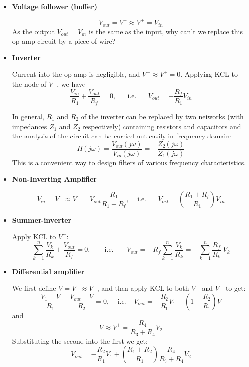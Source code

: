
\begin{itemize}
\item {\bf Voltage follower (buffer)}


\[
V_{out}=V^-\approx V^+=V_{in} 
\]
As the output $V_{out}=V_{in}$ is the same as the input, why can't we replace this
op-amp circuit by a piece of wire?

\item {\bf Inverter}


Current into the op-amp is negligible, and $V^-\approx V^+=0$. Applying KCL to
the node of $V^-$, we have
\[ 
\frac{V_{in}}{R_1}+\frac{V_{out}}{R_f}=0,\;\;\;\;\;\;\mbox{i.e.}\;\;\;\;\;\;
V_{out}=-\frac{R_f}{R_1}V_{in}	
\]

In general, $R_1$ and $R_2$ of the inverter can be replaced by two networks (with
impedances $Z_1$ and $Z_2$ respectively) containing resistors and capacitors and
the analysis of the circuit can be carried out easily in frequency domain:
\[
H(j\omega)=\frac{V_{out}(j\omega)}{V_{in}(j\omega)}=-\frac{Z_2(j\omega)}{Z_1(j\omega)}
\]
This is a convenient way to design filters of various frequency characteristics.



\item {\bf Non-Inverting Amplifier}


  \[
  V_{in}=V^+\approx V^-=V_{out}\frac{R_1}{R_1+R_f},\;\;\;\;\mbox{i.e.}
  \;\;\;\;\;\;
  V_{out}=\left(\frac{R_1+R_f}{R_1}\right)V_{in}
  \]

\item {\bf Summer-inverter}


  Apply KCL to $V^-$:
  \[ \sum_{k=1}^n \frac{V_k}{R_k}+\frac{V_{out}}{R_f}=0,\;\;\;\;\;\;\;
  \mbox{i.e.}\;\;\;\;\;\;\;V_{out}=-R_f \sum_{k=1}^n \frac{V_k}{R_k}
  =- \sum_{k=1}^n \frac{R_f}{R_k} \;V_k  \]

\item {\bf Differential amplifier}


  We first define $V=V^-\approx V^+$, and then apply KCL to both $V^-$ 
  and $V^+$ to get:
  \[ 
  \frac{V_1-V}{R_1}+\frac{V_{out}-V}{R_2}=0,\;\;\;\;\mbox{i.e.}\;\;\;\;
  V_{out}=-\frac{R_2}{R_1}V_1+\left(1+\frac{R_2}{R_1}\right) V 
  \]
  and
  \[ 
  V\approx V^+=\frac{R_4}{R_3+R_4}V_2 
  \]
  Substituting the second into the first we get:
  \[
  V_{out}=-\frac{R_2}{R_1}V_1+\left(\frac{R_1+R_2}{R_1}\right)\frac{R_4}{R_3+R_4}V_2 
  \]


\end{itemize}
